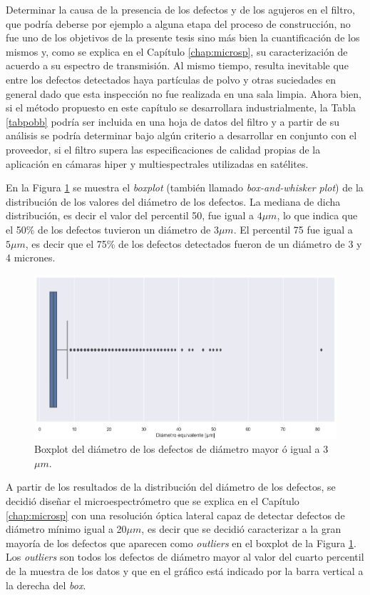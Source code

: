 Determinar la causa de la presencia de los defectos y de los agujeros en el filtro, que podría deberse por ejemplo a alguna etapa del proceso de construcción, no fue uno de los objetivos de la presente tesis sino más bien la cuantificación de los mismos y, como se explica en el Capítulo \ref{chap:microsp}, su caracterización de acuerdo a su espectro de transmisión. Al mismo tiempo, resulta inevitable que entre los defectos detectados haya partículas de polvo y otras suciedades en general dado que esta inspección no fue realizada en una sala limpia.  Ahora bien, si el método propuesto en este capítulo se desarrollara industrialmente, la Tabla \ref{tabpobb} podría ser incluida en una hoja de datos del filtro y a partir de su análisis se podría determinar bajo algún criterio a desarrollar en conjunto con el proveedor, si el filtro supera las especificaciones de calidad propias de la aplicación en cámaras hiper y multiespectrales utilizadas en satélites. 

En la Figura \ref{fig:boxpl} se muestra el \textit{boxplot} (también llamado \textit{box-and-whisker plot}) de la distribución de los valores del diámetro de los defectos. La mediana de dicha distribución, es decir el valor del percentil 50, fue igual a $4\mu m$, lo que indica que el 50\% de los defectos tuvieron un diámetro de $3 \mu m$. El percentil 75 fue igual a $5 \mu m$, es decir que el 75\% de los defectos detectados fueron de un diámetro de 3 y 4 micrones.

\begin{figure}
\centering
\includegraphics[scale=0.9]{Figs/cuantificaciondefectos/boxplotdefectos.png}
\caption{Boxplot del diámetro de los defectos de diámetro mayor ó igual a 3 $\mu m$.}
\label{fig:boxpl}
\end{figure}

A partir de los resultados de la distribución del diámetro de los defectos, se decidió diseñar el microespectrómetro que se explica en el Capítulo \ref{chap:microsp} con una resolución óptica lateral capaz de detectar defectos de diámetro mínimo igual a 20$\mu m$, es decir que se decidió caracterizar a la gran mayoría de los defectos que aparecen como \textit{outliers} en el boxplot de la Figura \ref{fig:boxpl}. Los \textit{outliers} son todos los defectos de diámetro mayor al valor del cuarto percentil de la muestra de los datos y que en el gráfico está indicado por la barra vertical a la derecha del \textit{box}.

